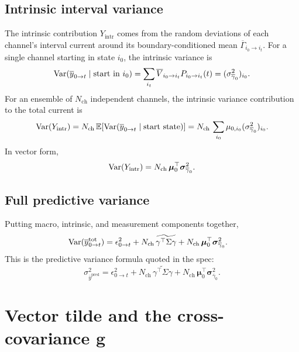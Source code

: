 \documentclass[11pt]{article}
\begin{document}
\subsection{Intrinsic interval variance}

The intrinsic contribution \(Y_{\text{intr}}\) comes from the random deviations
of each channel's interval current around its boundary-conditioned mean
\(\overline{\Gamma}_{i_0\to i_t}\). For a single channel starting in state
\(i_0\), the intrinsic variance is
\[
  \operatorname{Var}(\overline{y}_{0\to t}\mid \text{start in } i_0)
  =
  \sum_{i_t}
  \overline{V}_{i_0\to i_t}P_{i_0\to i_t}(t)
  =
  (\sigma^2_{\overline{\gamma}_0})_{i_0}.
\]
For an ensemble of \(N_{\text{ch}}\) independent channels, the intrinsic
variance contribution to the total current is
\[
  \operatorname{Var}(Y_{\text{intr}})
  =
  N_{\text{ch}}\,
  \mathbb{E}\!\left[
    \operatorname{Var}(\overline{y}_{0\to t}\mid \text{start state})
  \right]
  =
  N_{\text{ch}}\,
  \sum_{i_0}
  \mu_{0,i_0}(\sigma^2_{\overline{\gamma}_0})_{i_0}.
\]
In vector form,
\[
  \operatorname{Var}(Y_{\text{intr}})
  =
  N_{\text{ch}}\,
  \boldsymbol{\mu}_0^\top
  \boldsymbol{\sigma}^2_{\overline{\gamma}_0}.
\]

\subsection{Full predictive variance}

Putting macro, intrinsic, and measurement components together,
\begin{align*}
  \operatorname{Var}(\overline{y}^{\text{tot}}_{0\to t})
  &=
  \epsilon^2_{0\to t}
  +
  N_{\text{ch}}\,
  \widetilde{\gamma^\top\Sigma\gamma}
  +
  N_{\text{ch}}\,
  \boldsymbol{\mu}_0^\top
  \boldsymbol{\sigma}^2_{\overline{\gamma}_0}.
\end{align*}
This is the predictive variance formula quoted in the spec:
\[
  \boxed{
    \sigma^2_{\overline{y}^{\text{pred}}}
    =
    \epsilon^2_{0\to t}
    +
    N_{\text{ch}}\,
    \widetilde{\gamma^\top\Sigma\gamma}
    +
    N_{\text{ch}}\,
    \boldsymbol{\mu}_0^\top
    \boldsymbol{\sigma}^2_{\overline{\gamma}_0}.
  }
\]


\section{Vector tilde and the cross-covariance \texorpdfstring{$\mathbf{g}$}{g}}
\end{document}
